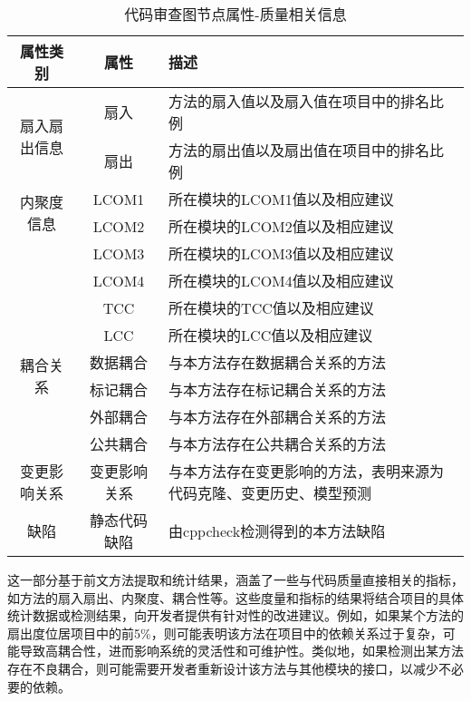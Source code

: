 \begin{table}[htbp]
    \caption{代码审查图节点属性-质量相关信息}
    \vspace{0.5em}\centering\wuhao
    \begin{tabular}{ccp{9cm}}
    \toprule
    属性类别 & 属性 & 描述 \\
    \midrule
    \multirow{2}{*}{扇入扇出信息}& 扇入 &  方法的扇入值以及扇入值在项目中的排名比例 \\       
                                & 扇出 &  方法的扇出值以及扇出值在项目中的排名比例 \\   \cline{2-3}
    \multirow{2}{*}{内聚度信息}& LCOM1 &  所在模块的LCOM1值以及相应建议 \\       
                                & LCOM2 &  所在模块的LCOM2值以及相应建议 \\    
                                & LCOM3 &  所在模块的LCOM3值以及相应建议 \\    
                                & LCOM4 &  所在模块的LCOM4值以及相应建议 \\    
                                & TCC &  所在模块的TCC值以及相应建议 \\    
                                & LCC &  所在模块的LCC值以及相应建议 \\   \cline{2-3}             
    \multirow{2}{*}{耦合关系}& 数据耦合 &  与本方法存在数据耦合关系的方法 \\       
                                & 标记耦合 &  与本方法存在标记耦合关系的方法 \\   
                                & 外部耦合 &  与本方法存在外部耦合关系的方法 \\   
                                & 公共耦合 &  与本方法存在公共耦合关系的方法 \\   \cline{2-3}
    变更影响关系 & 变更影响关系 &  与本方法存在变更影响的方法，表明来源为代码克隆、变更历史、模型预测 \\    \cline{2-3}
    缺陷 & 静态代码缺陷 &  由cppcheck检测得到的本方法缺陷 \\      
    \bottomrule
    \end{tabular}
    \end{table}

这一部分基于前文方法提取和统计结果，涵盖了一些与代码质量直接相关的指标，如方法的扇入扇出、内聚度、耦合性等。这些度量和指标的结果将结合项目的具体统计数据或检测结果，向开发者提供有针对性的改进建议。例如，如果某个方法的扇出度位居项目中的前5\%，则可能表明该方法在项目中的依赖关系过于复杂，可能导致高耦合性，进而影响系统的灵活性和可维护性。类似地，如果检测出某方法存在不良耦合，则可能需要开发者重新设计该方法与其他模块的接口，以减少不必要的依赖。



